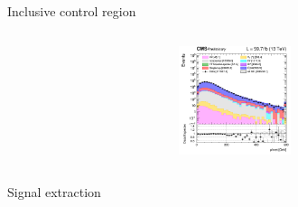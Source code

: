 \documentclass[8pt]{beamer}
\begin{document}
\begin{frame}{Inclusive control region}
\begin{columns}
\begin{column}{0.33\textwidth}
			\begin{center}
     			\includegraphics[width=1.0\textwidth, height=90pt]{figs/2018/log_cratio_inclusiveCR_df_METcorrected_pt.png}
    		\end{center}		
		\end{column}
\end{columns} \vfill
\end{frame}






















\begin{frame}[standout]
Signal extraction
\end{frame}
\end{document}
